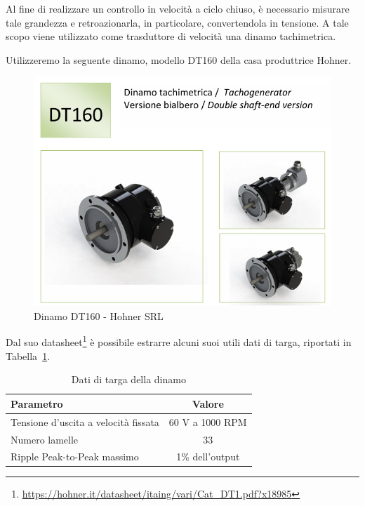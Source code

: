 \documentclass[a4paper,12pt]{article}
\begin{document}
Al fine di realizzare un controllo in velocità a ciclo chiuso, è necessario misurare tale grandezza e retroazionarla, in particolare, convertendola in tensione. A tale scopo viene utilizzato come trasduttore di velocità una dinamo tachimetrica.

\vspace{0.5cm}

Utilizzeremo la seguente dinamo, modello DT160 della casa produttrice Hohner.


\begin{figure}[h!]
\centering
    \includegraphics[scale=0.5]{Immagini/Altre/dinamo.PNG}
    \caption{Dinamo DT160 - Hohner SRL}
    \label{fig:dinamo}
\end{figure}

\vspace{0.5cm}

Dal suo datasheet\footnote{\url{https://hohner.it/datasheet/itaing/vari/Cat_DT1.pdf?x18985}} è possibile estrarre alcuni suoi utili dati di targa, riportati in Tabella~\ref{tab:targa_dinamo}.

\begin{table}
    \centering
    \begin{tabular}{|l|c|}
    \hline
    \textbf{Parametro} & \textbf{Valore} \\
    \hline
    Tensione d'uscita a velocità fissata & 60 V a 1000 RPM \\
    \hline
    Numero lamelle & 33 \\
    \hline
    Ripple Peak-to-Peak massimo & 1\% dell'output \\
    \hline
    \end{tabular}
    \caption{Dati di targa della dinamo}
    \label{tab:targa_dinamo}
\end{table}
\end{document}
